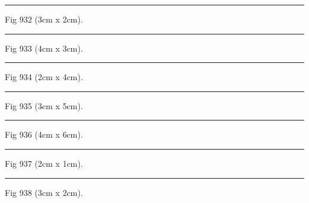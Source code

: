 \documentclass[a4paper,11pt]{article}
\begin{document}
\begin{swarmwrap}%
  \begin{minipage}[t]{3cm}
    \centering
    \rule{\linewidth}{2cm}
    {\footnotesize Fig 932 (3cm x 2cm).}
  \end{minipage}%
\end{swarmwrap}%
\swarmwrapnext
\lipsum[32]%

\begin{swarmwrap}%
  \begin{minipage}[t]{4cm}
    \centering
    \rule{\linewidth}{3cm}
    {\footnotesize Fig 933 (4cm x 3cm).}
  \end{minipage}%
\end{swarmwrap}%
\swarmwrapnext
\lipsum[33]%

\begin{swarmwrap}%
  \begin{minipage}[t]{2cm}
    \centering
    \rule{\linewidth}{4cm}
    {\footnotesize Fig 934 (2cm x 4cm).}
  \end{minipage}%
\end{swarmwrap}%
\swarmwrapnext
\lipsum[34]%

\begin{swarmwrap}%
  \begin{minipage}[t]{3cm}
    \centering
    \rule{\linewidth}{5cm}
    {\footnotesize Fig 935 (3cm x 5cm).}
  \end{minipage}%
\end{swarmwrap}%
\swarmwrapnext
\lipsum[35]%

\begin{swarmwrap}%
  \begin{minipage}[t]{4cm}
    \centering
    \rule{\linewidth}{6cm}
    {\footnotesize Fig 936 (4cm x 6cm).}
  \end{minipage}%
\end{swarmwrap}%
\swarmwrapnext
\lipsum[36]%

\begin{swarmwrap}%
  \begin{minipage}[t]{2cm}
    \centering
    \rule{\linewidth}{1cm}
    {\footnotesize Fig 937 (2cm x 1cm).}
  \end{minipage}%
\end{swarmwrap}%
\swarmwrapnext
\lipsum[37]%

\begin{swarmwrap}%
  \begin{minipage}[t]{3cm}
    \centering
    \rule{\linewidth}{2cm}
    {\footnotesize Fig 938 (3cm x 2cm).}
  \end{minipage}%
\end{swarmwrap}%
\swarmwrapnext
\lipsum[38]%
\end{document}
